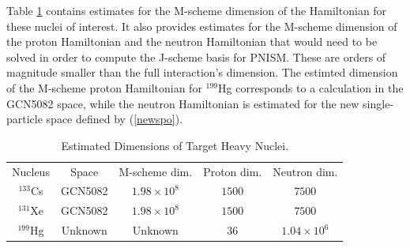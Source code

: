 Table \ref{estimates} contains estimates for the M-scheme dimension of the Hamiltonian
for these nuclei of interest. It also provides estimates for the M-scheme dimension of the
proton Hamiltonian and the neutron Hamiltonian that would need to be solved in order
to compute the J-scheme basis for PNISM. These are orders of magnitude smaller than 
the full interaction's dimension. The estimted dimension of the M-scheme
 proton Hamiltonian for $^{199}$Hg corresponds to a calculation in the GCN5082 space, while the 
neutron Hamiltonian is estimated for the new single-particle space defined by (\ref{newspo}).

\begin{table}[h]
    \caption{Estimated Dimensions of Target Heavy Nuclei.}
    \label{estimates}
    \begin{tabular}
        {c c c c c}
        \hline
        \hline
        Nucleus    & Space   & M-scheme dim.      & Proton dim. & Neutron dim. \\
        $^{133}$Cs & GCN5082 & $1.98 \times 10^8$ & $1500$ & $7500$ \\
        $^{131}$Xe & GCN5082 & $1.98 \times 10^8$ & $1500$ & $7500$ \\
        $^{199}$Hg & Unknown & Unknown            & $36$   & $1.04\times 10^6$\\
        
        \hline
        \hline
    \end{tabular}

\end{table}


